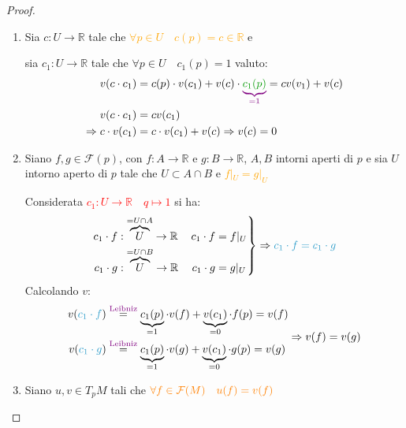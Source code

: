         \begin{proof}
        \mbox{}

        \begin{enumerate}
        \item Sia $c : U \to \mathbb{R}$ tale che \textcolor{orange}{$\forall p \in U \quad c(p) = c \in \mathbb{R}$} e 
        
        sia $c_1 : U \to \mathbb{R}$ tale che $\forall p \in U \quad c_1(p) = 1$ valuto:
        \begin{align*}
        v(c \cdot c_1) &= c(p) \cdot v(c_1) + v(c) \cdot \textcolor{violet}{\underbrace{\textcolor{verde}{c_1(p)}}_{=1}} = c v(v_1) +v(c) \\
        v(c \cdot c_1) &= c v(c_1)\\
        \Rightarrow c \cdot v(c_1) &= c \cdot v(c_1) + v(c) \Rightarrow v(c) = 0
        \end{align*}

        \item Siano $f, g \in \mathcal{F}(p)$, con $f : A \to \mathbb{R}$ e $g : B \to \mathbb{R}$, $A, B$ intorni aperti di 
        $p$ e sia $U$ intorno aperto di $p$ tale che $U \subset A \cap B$ e \textcolor{orange}{$f|_U = g|_U$}
        
        Considerata \textcolor{red}{$c_1 : U \to \mathbb{R} \quad q \longmapsto 1$} si ha:
        \[
        \left.
        \begin{aligned}
        c_1 \cdot f &: \overbrace{U}^{= U \cap A} \to \mathbb{R} \, & c_1 \cdot f &= f|_U \\
        c_1 \cdot g &: \overbrace{U}^{= U \cap B} \to \mathbb{R} \, & c_1 \cdot g &= g|_U
        \end{aligned}
        \right\} \Rightarrow \textcolor{celeste}{c_1 \cdot f = c_1 \cdot g}
        \]
        Calcolando $v$:
        \[ \begin{aligned}
        v(\textcolor{celeste}{c_1 \cdot f}) &\overset{\textcolor{violet}{\text{Leibniz}}}{=} \underbrace{c_1(p)}_{=1} \cdot v(f) + \underbrace{v(c_1)}_{= 0} \cdot f(p) = v(f) \\
        v(\textcolor{celeste}{c_1 \cdot g}) &\overset{\textcolor{violet}{\text{Leibniz}}}{=} \underbrace{c_1(p)}_{=1}  \cdot v(g) + \underbrace{v(c_1)}_{= 0} \cdot g(p) = v(g)
        \end{aligned} \Rightarrow v(f) = v(g) \]

        \item Siano $u, v \in T_p M$ tali che $\textcolor{orange}{\forall f \in \mathcal{F}(M) \quad u(f) = v(f)}$ 
        

\end{enumerate}
\end{proof}

